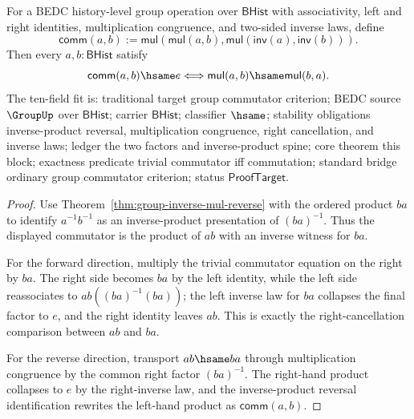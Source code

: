 \begin{theorem}
\label{thm:group-commutator-trivial-iff-commutes}
For a BEDC history-level group operation over $\mathsf{BHist}$ with
associativity, left and right identities, multiplication congruence, and
two-sided inverse laws, define
$$
\mathsf{comm}(a,b):=\mathsf{mul}(\mathsf{mul}(a,b),
\mathsf{mul}(\mathsf{inv}(a),\mathsf{inv}(b))).
$$
Then every $a,b:\mathsf{BHist}$ satisfy
$$
\mathsf{comm}(a,b)\hsame e \Longleftrightarrow
\mathsf{mul}(a,b)\hsame \mathsf{mul}(b,a).
$$
The ten-field fit is: traditional target group commutator criterion; BEDC
source $\GroupUp$ over $\mathsf{BHist}$; carrier $\mathsf{BHist}$; classifier
$\hsame$; stability obligations inverse-product reversal, multiplication
congruence, right cancellation, and inverse laws; ledger the two factors and
inverse-product spine; core theorem this block; exactness predicate trivial
commutator iff commutation; standard bridge ordinary group commutator
criterion; status $\mathsf{ProofTarget}$.
\end{theorem}
\begin{proof}
Use Theorem~\ref{thm:group-inverse-mul-reverse} with the ordered product
$ba$ to identify $a^{-1}b^{-1}$ as an inverse-product presentation of
$(ba)^{-1}$. Thus the displayed commutator is the product of $ab$ with an
inverse witness for $ba$.

For the forward direction, multiply the trivial commutator equation on the
right by $ba$. The right side becomes $ba$ by the left identity, while the
left side reassociates to $ab((ba)^{-1}(ba))$; the left inverse law for $ba$
collapses the final factor to $e$, and the right identity leaves $ab$. This
is exactly the right-cancellation comparison between $ab$ and $ba$.

For the reverse direction, transport $ab\hsame ba$ through multiplication
congruence by the common right factor $(ba)^{-1}$. The right-hand product
collapses to $e$ by the right-inverse law, and the inverse-product reversal
identification rewrites the left-hand product as
$\mathsf{comm}(a,b)$.
\end{proof}

